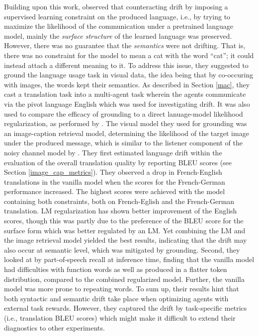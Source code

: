Building upon this work, \cite{lee2019countering} observed that counteracting drift by imposing a supervised learning constraint on the produced language, i.e., by trying to maximize the likelihood of the communication under a pretrained language model, mainly the \textit{surface structure} of the learned language was preserved. However, there was no guarantee that the \textit{semantics} were not drifting. That is, there was no constraint for the model to mean a cat with the word ``cat''; it could instead attach a different meaning to it.  To address this issue, they suggested to ground the language usage task in visual data, the idea being that by co-occuring with images, the words kept their semantics. As described in Section \ref{mac}, they cast a translation task into a multi-agent task wherein the agents communicate via the pivot language English which was used for investigating drift. It was also used to compare the efficacy of grounding to a direct lanuage-model likelihood regularization, as performed by \cite{lewis2017deal}. The visual model they used for grounding was an image-caption retrieval model, determining the likelihood of the target image under the produced message, which is similar to the listener component of the noisy channel model by \cite{lazaridou2020multi}.
They first estimated language drift within the evaluation of the overall translation quality by reporting BLEU scores (see Section \ref{image_cap_metrics}). They observed a drop in French-English translations in the vanilla model when the scores for the French-German performance increased. The highest scores were achieved with the model containing both constraints, both on French-Eglish and the French-German translation. LM regularization has shown better improvement of the English scores, though this was partly due to the preference of the BLEU score for the surface form which was better regulated by an LM. Yet combining the LM and the image retrieval model yielded the best results, indicating that the drift may also occur at semantic level, which was mitigated by grounding. Second, they looked at by part-of-speech recall at inference time, finding that the vanilla model had difficulties with function words as well as produced in a flatter token distribution, compared to the combined regularized model. Further, the vanilla model was more prone to repeating words. To sum up, their results hint that both syntactic and semantic drift take place when optimizing agents with external task rewards. However, they captured the drift by task-specific metrics (i.e., translation BLEU scores) which might make it difficult to extend their diagnostics to other experiments.

